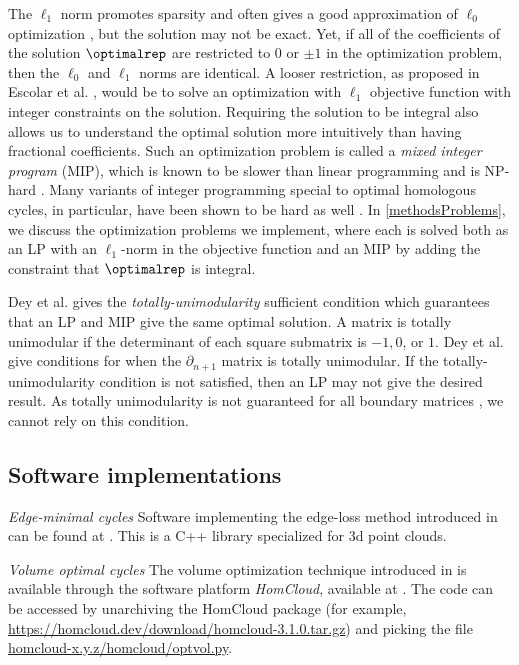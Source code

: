 The  $\ell_1$ norm promotes sparsity and often gives a good approximation of $\ell_0$ optimization \cite{dohono,NPhardL0}, but the solution may not be exact. Yet, if all of the coefficients of the solution $\optimalrep$ are restricted to $0$ or $\pm 1$ in the optimization problem, then the $\ell_0$ and $\ell_1$ norms are identical. A looser restriction, as proposed in Escolar et al. \cite{Escolar2016}, would be to solve an optimization with $\ell_1$ objective function with integer constraints on the solution. %
Requiring the solution to be integral also allows us to understand the optimal solution more intuitively than having fractional coefficients. Such an optimization problem is called a \textit{mixed integer program} (MIP), which is known to be slower than linear programming and is NP-hard \cite{Obayashi2018}. Many variants of integer programming special to optimal homologous cycles, in particular, have been shown to be hard as well \cite{borradaile2020minimum}. In \se \ref{methodsProblems}, we discuss the optimization problems we implement, where each is solved both as an LP with an $\ell_1$-norm in the objective function and an MIP by adding the constraint that $\optimalrep$ is integral. 

Dey et al. \cite{dey2011optimal} gives the \textit{totally-unimodularity} sufficient condition which guarantees that an LP and MIP give the same optimal solution. A matrix is totally unimodular if the determinant of each square submatrix is $-1, 0$, or $1$. Dey et al. \cite{dey2011optimal} give conditions for when the $\partial_{n+1}$ matrix is totally unimodular. If the totally-unimodularity condition is not satisfied, then an LP may not give the desired result. As totally unimodularity is not guaranteed for all boundary matrices \cite{henselman2014combinatorial}, we cannot rely on this condition. 

\subsection{Software implementations}
\label{sec:existingimplementations}

\emph{Edge-minimal cycles}  Software implementing the edge-loss method introduced in \cite{Escolar2016} can be found at \cite{OptiPersLP}.  This is a C++ library specialized for 3d point clouds.


\emph{Volume optimal cycles} The volume optimization technique introduced in \cite{Obayashi2018} is available through the software platform \emph{HomCloud}, available at  \cite{homcloud}.  The code can be accessed by unarchiving the HomCloud package  (for example,
\url{https://homcloud.dev/download/homcloud-3.1.0.tar.gz}) and picking the
file \url{homcloud-x.y.z/homcloud/optvol.py}.


